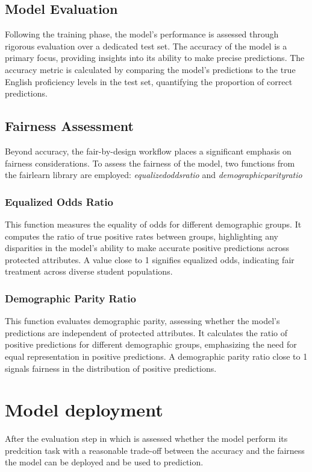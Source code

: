 \subsection{Model Evaluation}

Following the training phase, the model's performance is assessed through rigorous evaluation over a dedicated test set. The accuracy of the model is a primary focus, providing insights into its ability to make precise predictions. The accuracy metric is calculated by comparing the model's predictions to the true English proficiency levels in the test set, quantifying the proportion of correct predictions.

\subsection{Fairness Assessment}

Beyond accuracy, the fair-by-design workflow places a significant emphasis on fairness considerations. To assess the fairness of the model, two functions from the fairlearn library are employed: \emph{equalized\textunderscore odds\textunderscore ratio} and \emph{demographic\textunderscore parity\textunderscore ratio}

\subsubsection{Equalized Odds Ratio}

This function measures the equality of odds for different demographic groups. It computes the ratio of true positive rates between groups, highlighting any disparities in the model's ability to make accurate positive predictions across protected attributes. A value close to 1 signifies equalized odds, indicating fair treatment across diverse student populations.

\subsubsection{Demographic Parity Ratio}

This function evaluates demographic parity, assessing whether the model's predictions are independent of protected attributes. It calculates the ratio of positive predictions for different demographic groups, emphasizing the need for equal representation in positive predictions. A demographic parity ratio close to 1 signals fairness in the distribution of positive predictions.

\section{Model deployment}
\label{section:model-deployment}

After the evaluation step in which is assessed whether the model perform its predcition task with a reasonable trade-off between the accuracy and the fairness the model can be deployed and be used to prediction.
